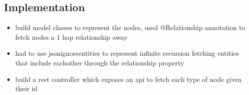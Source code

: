 \subsection{Implementation}

\begin{itemize}
    \item build model classes to represent the nodes, used @Relationship annotation to fetch nodes a 1 hop relationship away
    \item had to use jsonignoreentities to represent infinite recursion fetching entities that include eachother through the relationship property 
    \item build a rest controller which exposes an api to fetch each type of node given their id
    
\end{itemize}


